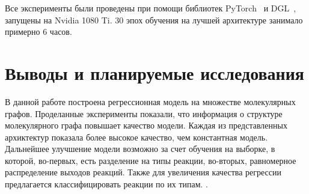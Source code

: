 \documentclass[12pt, twoside]{article}
\begin{document}
 
 Все эксперименты были проведены при помощи библиотек PyTorch~\cite{paszke2019pytorch} и DGL~\cite{wang2019deep}, запущены на Nvidia 1080 Ti. $30$ эпох обучения на лучшей архитектуре занимало примерно 6 часов.


\section{Выводы и планируемые исследования}

В данной работе построена регрессионная модель на множестве молекулярных графов. 
Проделанные эксперименты показали, что информация о структуре молекулярного графа повышает качество модели. Каждая из представленных архиктектур показала более высокое качество, чем константная модель. 
Дальнейшее улучшение модели возможно за счет обучения на выборке, в которой, во-первых, есть разделение на типы реакции, во-вторых, равномерное распределение выходов реакций. Также для увеличения качества регрессии предлагается классифицировать реакции по их типам.
.


{}

\end{document}
